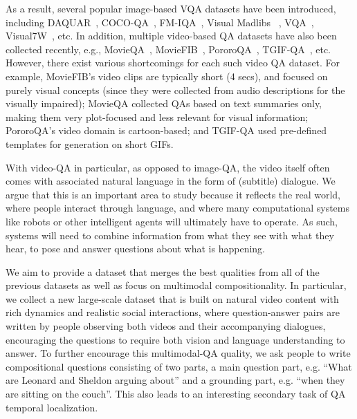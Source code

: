 \documentclass[11pt,a4paper]{article}
\begin{document}
As a result, several popular image-based VQA datasets have been introduced, including DAQUAR~\cite{malinowski2014multi}, COCO-QA~\cite{ren2015exploring}, FM-IQA~\cite{gao2015you}, Visual Madlibs~
\cite{Yu2015VisualMF}, VQA~\cite{Antol2015VQAVQ}, Visual7W~\cite{zhu2016visual7w}, etc.
In addition, multiple video-based QA datasets have also been collected recently, e.g., MovieQA~\cite{Tapaswi2016MovieQAUS}, MovieFIB~\cite{maharaj2017dataset}, PororoQA~\cite{Kim2017DeepStoryVS}, TGIF-QA~\cite{Jang2017TGIFQATS}, etc.
However, there exist various shortcomings for each such video QA dataset.
For example, MovieFIB's video clips are typically short (4 secs), and focused on purely visual concepts (since they were collected from audio descriptions for the visually impaired); MovieQA collected QAs based on text summaries only, making them very plot-focused and less relevant for visual information; PororoQA's video domain is cartoon-based; and TGIF-QA used pre-defined templates for generation on short GIFs. 



With video-QA in particular, as opposed to image-QA, the video itself often comes with associated natural language in the form of (subtitle) dialogue. We argue that this is an important area to study because it reflects the real world, where people interact through language, and where many computational systems like robots or other intelligent agents will ultimately have to operate. As such, systems will need to combine information from what they see with what they hear, to pose and answer questions about what is happening.


We aim to provide a dataset that merges the best qualities from all of the previous datasets as well as focus on multimodal compositionality. In particular, we collect a new large-scale dataset that is built on natural video content with rich dynamics and realistic social interactions, where question-answer pairs are written by people observing both videos and their accompanying dialogues, encouraging the questions to require both vision and language understanding to answer. To further encourage this multimodal-QA quality, we ask people to write compositional questions consisting of two parts, a main question part, e.g. ``What are Leonard and Sheldon arguing about'' and a grounding part, e.g. ``when they are sitting on the couch''. This also leads to an interesting secondary task of QA temporal localization.
\end{document}
